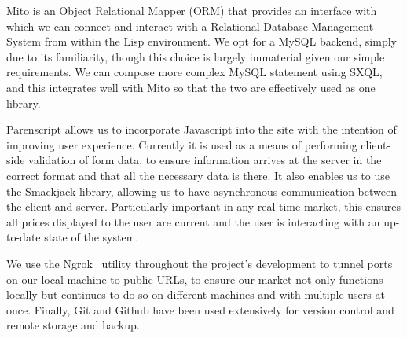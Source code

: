 Mito is an Object Relational Mapper (ORM) that provides an interface with which
we can connect and interact with a Relational Database Management System from
within the Lisp environment. We opt for a MySQL backend, simply due to its
familiarity, though this choice is largely immaterial given our simple
requirements. We can compose more complex MySQL statement using SXQL, and this
integrates well with Mito so that the two are effectively used as one library.

Parenscript allows us to incorporate Javascript into the site with the
intention of improving user experience. Currently it is used as a means of
performing client-side validation of form data, to ensure information arrives
at the server in the correct format and that all the necessary data is there.
It also enables us to use the Smackjack library, allowing us to have
asynchronous communication between the client and server. Particularly
important in any real-time market, this ensures all prices displayed to the
user are current and the user is interacting with an up-to-date state of the
system.

We use the Ngrok~\cite{ngrok} utility throughout the project's development to
tunnel ports on our local machine to public URLs, to ensure our market not only
functions locally but continues to do so on different machines and with
multiple users at once. Finally, Git and Github have been used extensively for
version control and remote storage and backup.
